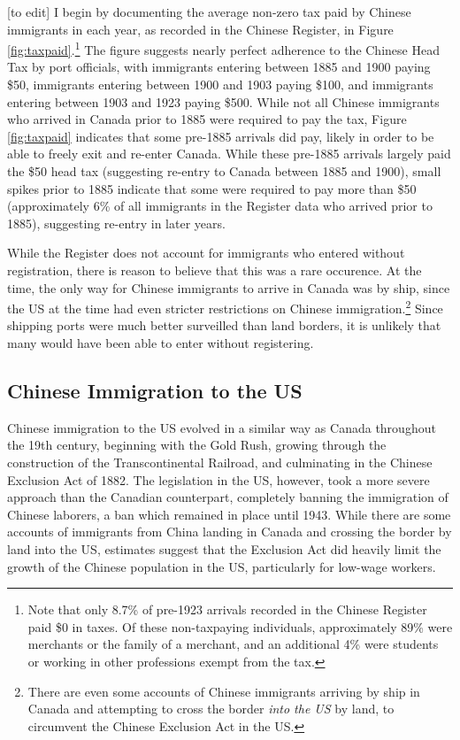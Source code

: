 [to edit] I begin by documenting the average non-zero tax paid by Chinese immigrants in each year, as recorded in the Chinese Register, in Figure \ref{fig:taxpaid}.\footnote{Note that only 8.7\% of pre-1923 arrivals recorded in the Chinese Register paid \$0 in taxes. 
Of these non-taxpaying individuals, approximately 89\% were merchants or the family of a merchant, and an additional 4\% were students or working in other professions exempt from the tax.} The figure suggests nearly perfect adherence to the Chinese Head Tax by port officials, with immigrants entering between 1885 and 1900 paying \$50, immigrants entering between 1900 and 1903 paying \$100, and immigrants entering between 1903 and 1923 paying \$500. 
While not all Chinese immigrants who arrived in Canada prior to 1885 were required to pay the tax, Figure \ref{fig:taxpaid} indicates that some pre-1885 arrivals did pay, likely in order to be able to freely exit and re-enter Canada. While these pre-1885 arrivals largely paid the \$50 head tax (suggesting re-entry to Canada between 1885 and 1900), small spikes prior to 1885 indicate that some were required to pay more than \$50 (approximately 6\% of all immigrants in the Register data who arrived prior to 1885), suggesting re-entry in later years. 

While the Register does not account for immigrants who entered without registration, there is reason to believe that this was a rare occurence. At the time, the only way for Chinese immigrants to arrive in Canada was by ship, since the US at the time had even stricter restrictions on Chinese immigration.\footnote{There are even some accounts of Chinese immigrants arriving by ship in Canada and attempting to cross the border \textit{into the US }by land, to circumvent the Chinese Exclusion Act in the US.} Since shipping ports were much better surveilled than land borders, it is unlikely that many would have been able to enter without registering. 

\subsection{Chinese Immigration to the US}
Chinese immigration to the US evolved in a similar way as Canada throughout the 19th century, beginning with the Gold Rush, growing through the construction of the Transcontinental Railroad, and culminating in the Chinese Exclusion Act of 1882.
The legislation in the US, however, took a more severe approach than the Canadian counterpart, completely banning the immigration of Chinese laborers, a ban which remained in place until 1943. 
While there are some accounts of immigrants from China landing in Canada and crossing the border by land into the US, estimates suggest that the Exclusion Act did heavily limit the growth of the Chinese population in the US, particularly for low-wage workers.